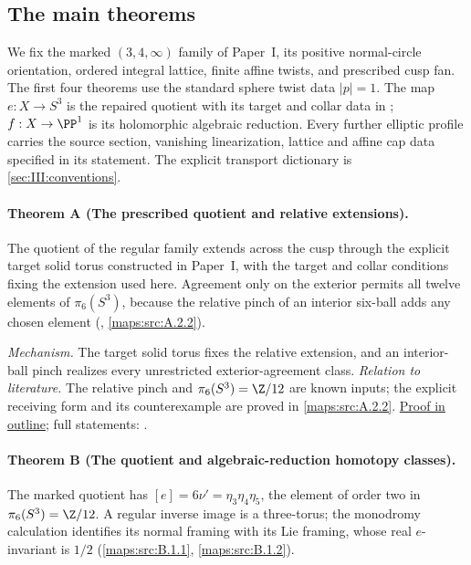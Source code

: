 \subsection{The main theorems}
\label{series:III:main-theorems}

We fix the marked $(3,4,\infty)$ family of Paper~I, its positive
normal-circle orientation, ordered integral lattice, finite affine twists,
and prescribed cusp fan. The first four theorems use the standard
sphere twist data $|p|=1$. The map $e:X\to S^3$ is the repaired quotient
with its target and collar data in ;
$f:X\to\PP^1$ is its holomorphic algebraic reduction. Every further
elliptic profile carries the source section, vanishing linearization,
lattice and affine cap data specified in its statement. The explicit
transport dictionary is \ref{sec:III:conventions}.

\hypertarget{main-III-A}{}
\paragraph{Theorem A (The prescribed quotient and relative extensions).}
\label{series:III:A}
The quotient of the regular family extends across the cusp through
the explicit target solid torus constructed in Paper~I, with the
target and collar conditions fixing the extension used here.
Agreement only on the exterior permits all twelve elements of
$\pi_6(S^3)$, because the relative pinch of an interior six-ball
adds any chosen element (, \cref{maps:src:A.2.2}).

\textit{Mechanism.} The target solid torus fixes the relative extension, and an interior-ball pinch realizes every unrestricted exterior-agreement class.
\textit{Relation to literature.} The relative pinch and $\pi_6(S^3)=\Z/12$ are known inputs; the explicit receiving form and its counterexample are proved in \cref{maps:src:A.2.2}.
\hyperlink{outline-III-A}{Proof in outline}; full statements: .

\hypertarget{main-III-B}{}
\paragraph{Theorem B (The quotient and algebraic-reduction homotopy classes).}
\label{series:III:B}
The marked quotient has
$[e]=6\nu'=\eta_3\eta_4\eta_5$, the element of order two in
$\pi_6(S^3)=\Z/12$.  A regular inverse image is a three-torus;
the monodromy calculation identifies its normal framing with its Lie
framing, whose real $e$-invariant is $1/2$
(\cref{maps:src:B.1.1}, \cref{maps:src:B.1.2}).

